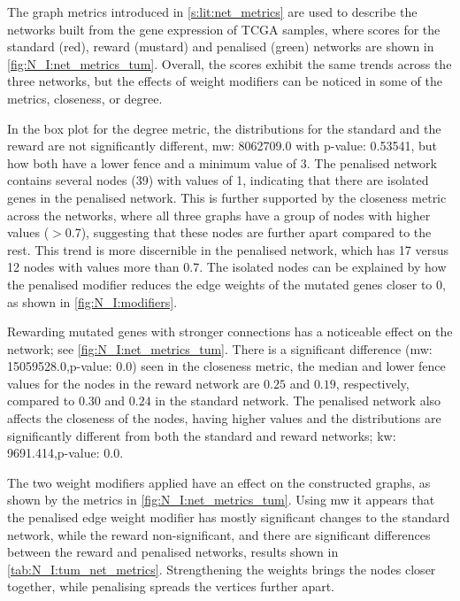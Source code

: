 The graph metrics introduced in \cref{s:lit:net_metrics} are used to describe the networks built from the gene expression of TCGA samples, where scores for the standard (red), reward (mustard) and penalised (green) networks are shown in \cref{fig:N_I:net_metrics_tum}. Overall, the scores exhibit the same trends across the three networks, but the effects of weight modifiers can be noticed in some of the metrics, closeness, or degree.

In the box plot for the degree metric, the distributions for the standard and the reward are not significantly different, \acrfull{mw}: 8062709.0 with p-value: 0.53541, but how both have a lower fence and a minimum value of 3. The penalised network contains several nodes (39) with values of 1, indicating that there are isolated genes in the penalised network. This is further supported by the closeness metric across the networks, where all three graphs have a group of nodes with higher values ($>$0.7), suggesting that these nodes are further apart compared to the rest. This trend is more discernible in the penalised network, which has 17 versus 12 nodes with values more than 0.7. The isolated nodes can be explained by how the penalised modifier reduces the edge weights of the mutated genes closer to 0, as shown in \cref{fig:N_I:modifiers}.

Rewarding mutated genes with stronger connections has a noticeable effect on the network; see \cref{fig:N_I:net_metrics_tum}. There is a significant difference (\acrshort{mw}: 15059528.0,p-value: 0.0) seen in the closeness metric, the median and lower fence values for the nodes in the reward network are $0.25$ and $0.19$, respectively, compared to $0.30$ and $0.24$ in the standard network. The penalised network also affects the closeness of the nodes, having higher values and the distributions are significantly different from both the standard and reward networks; \acrfull{kw}: 9691.414,p-value: 0.0. 

The two weight modifiers applied have an effect on the constructed graphs, as shown by the metrics in \cref{fig:N_I:net_metrics_tum}. Using \acrlong{mw} it appears that the penalised edge weight modifier has mostly significant changes to the standard network, while the reward non-significant, and there are significant differences between the reward and penalised networks, results shown in \cref{tab:N_I:tum_net_metrics}. Strengthening the weights brings the nodes closer together, while penalising spreads the vertices further apart. 

